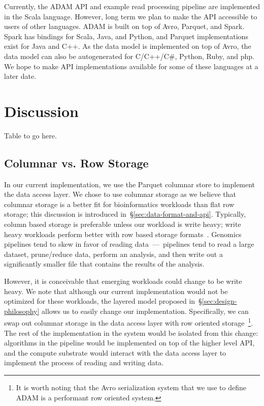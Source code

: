 \documentclass[10pt,twocolumn]{article}
\theoremstyle{plain}
\begin{document}
Currently, the ADAM API and example read processing pipeline are implemented in the Scala language. However, long
term we plan to make the API accessible to users of other languages. ADAM is built on top of Avro, Parquet, and Spark.
Spark has bindings for Scala, Java, and Python, and Parquet implementations exist for Java and C++. As the data model
is implemented on top of Avro, the data model can also be auto\-generated for C/C++/C\#, Python, Ruby, and php. We hope
to make API implementations available for some of these languages at a later date.

\section{Discussion}
\label{sec:discussion}

Table to go here.

\subsection{Columnar vs. Row Storage}
\label{sec:columnar-vs-row-storage}

In our current implementation, we use the Parquet columnar store to implement the data access layer. We chose to use
columnar storage as we believe that columnar storage is a better fit for bioinformatics workloads than flat row storage;
this discussion is introduced in~\S\ref{sec:data-format-and-api}. Typically, column based storage is preferable unless
our workload is write heavy; write heavy workloads perform better with row based storage formats~\cite{stonebraker05}.
Genomics pipelines tend to skew in favor of reading data~---~pipelines tend to read a large dataset, prune/reduce data,
perform an analysis, and then write out a significantly smaller file that contains the results of the analysis.

However, it is conceivable that emerging workloads could change to be write heavy. We note that although our current
implementation would not be optimized for these workloads, the layered model proposed in~\S\ref{sec:design-philosophy}
allows us to easily change our implementation. Specifically, we can swap out columnar storage in the data access layer with
row oriented storage~\footnote{It is worth noting that the Avro serialization system that we use to define ADAM is a performant
row oriented system.}. The rest of the implementation in the system would be isolated from this change: algorithms in the
pipeline would be implemented on top of the higher level API, and the compute substrate would interact with the data access
layer to implement the process of reading and writing data.
\end{document}
